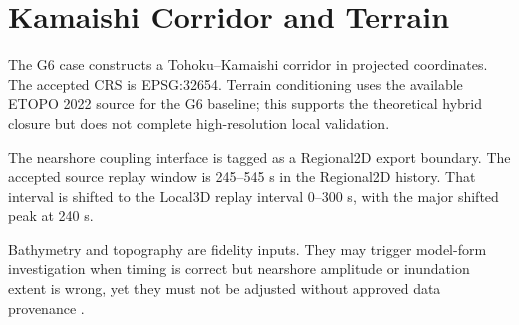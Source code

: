 \section{Kamaishi Corridor and Terrain}

The G6 case constructs a Tohoku--Kamaishi corridor in projected coordinates. The accepted CRS is EPSG:32654. Terrain conditioning uses the available ETOPO 2022 source for the G6 baseline; this supports the theoretical hybrid closure but does not complete high-resolution local validation.

The nearshore coupling interface is tagged as a Regional2D export boundary. The accepted source replay window is 245--545 s in the Regional2D history. That interval is shifted to the Local3D replay interval 0--300 s, with the major shifted peak at 240 s.

Bathymetry and topography are fidelity inputs. They may trigger model-form investigation when timing is correct but nearshore amplitude or inundation extent is wrong, yet they must not be adjusted without approved data provenance \autocite{noaa2022etopo,gebco2026grid}.
